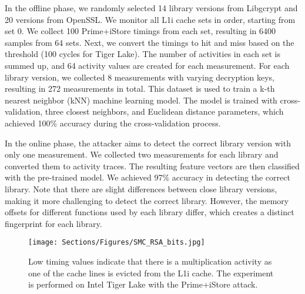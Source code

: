 In the offline phase, we randomly selected 14 library versions from Libgcrypt and 20 versions from OpenSSL. 
We monitor all L1i cache sets in order, starting from set 0. We collect 100 Prime+iStore timings from each set, resulting in 6400 samples from 64 sets.
Next, we convert the timings to hit and miss based on the threshold (100 cycles for Tiger Lake). 
The number of activities in each set is summed up, and 64 activity values are created for each measurement. For each library version, we collected 8 measurements with varying decryption keys, resulting in 272 measurements in total. This dataset is used to train a k-th nearest neighbor (kNN) machine learning model. The model is trained with cross-validation, three closest neighbors, and Euclidean distance parameters, which achieved 100\% accuracy during the cross-validation process.

In the online phase, the attacker aims to detect the correct library version with only one measurement. We collected two measurements for each library and converted them to activity traces. The resulting feature vectors are then classified with the pre-trained model. We achieved 97\% accuracy in detecting the correct library. Note that there are slight differences between close library versions, making it more challenging to detect the correct library. However, the memory offsets for different functions used by each library differ, which creates a distinct fingerprint for each library. 

\begin{figure}[t]
    \centering
    {
    \texttt{[image: Sections/Figures/SMC\_RSA\_bits.jpg]}
    }
    \caption{Low timing values indicate that there is a multiplication activity as one of the cache lines is evicted from the L1i cache. The experiment is performed on Intel Tiger Lake with the Prime+iStore attack.}
    \label{fig:RSA_bits}
\end{figure}

